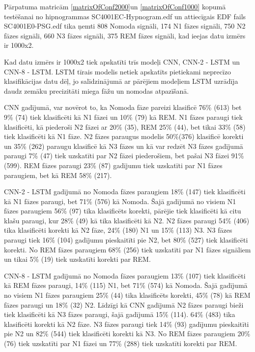 \documentclass[12pt,paper=A4]{report}
\begin{document}
Pārpatuma matricām \ref{matrixOfConf2000}un \ref{matrixOfConf1000} kopumā testēšanai no hipnogrammas SC4001EC-Hypnogram.edf un attiecīgais EDF fails SC4001E0-PSG.edf tika ņemti 808‬ Nomoda signāli, 174 N1 fāzes signāli, 750 N2 fāzes signāli, 660 N3 fāzes signāli, 375 REM fāzes signāli, kad ieejas datu izmērs ir 1000x2.

Kad datu izmērs ir 1000x2 tiek apskatīti trīs modeļi CNN, CNN-2 - LSTM un CNN-8 - LSTM. LSTM tīrais modelis netiek apskatīts pietiekami neprecīzo klasifikācijas datu dēļ, jo salīdzinājumā ar pārējiem modeļiem LSTM uzrādīja daudz zemāku precizitāti miega fāžu un nomodas atpazīšanā. 

CNN gadījumā, var novērot to, ka Nomoda fāze pareizi klasificē 76\% (613) bet 9\% (74) tiek klasificēti 
kā N1 fāzei un 10\% (79) kā REM.
N1 fāzes paraugi tiek klasificēti, kā piederoši N2 fāzei ar 20\% (35), REM 25\% (44), bet tikai 33\% (58) tiek klasificēti kā 
N1 fāze. 
N2 fāzes paraugus modelis 50\%(376) klasificē korekti un 35\% (262) paraugu klasificē kā N3 fāzes un kā var redzēt N3 fāzes
 gadījumā paraugi 7\% (47) tiek uzskatīti par N2 fāzei piederošiem, bet pašai N3 fāzei 91\% (599). 
 REM fāzes paraugi 23\% (87) gadījumu tiek uzskatīti par N1 fāzes paraugiem, bet kā REM 58\% (217). 

CNN-2 - LSTM gadījumā no Nomoda fāzes paraugiem 18\% (147) tiek klasificēti kā N1 fāzes paraugi, bet 71\% (576) kā Nomoda. 
Šajā gadījumā no visiem N1 fāzes paraugiem 56\% (97) tika klasificēts korekti, 
pārējie tiek klasificēti kā citu klašu paraugi, kur 28\% (49) kā tika klasificēti kā N2. 
N2 fāzes paraugi 54\% (406) tika klasificēti korekti kā N2 fāze, 24\% (180) N1 un 15\% (113) N3. 
N3 fāzes paraugi tiek 16\% (104) gadījumu pieskaitīti pie N2, bet 80\% (527) tiek klasificēti korekti.
No REM fāzes paraugiem 68\% (256) tiek uzskatīti par N1 fāzes signāliem un tikai 5\% (19) tiek uzskatīti korekti par REM.

CNN-8 - LSTM gadījumā no Nomoda fāzes paraugiem 13\% (107) tiek klasificēti kā REM fāzes paraugi, 14\% (115) N1, bet 71\% (574) kā Nomoda. 
Šajā gadījumā no visiem N1 fāzes paraugiem 25\% (44) tika klasificēts korekti, 45\% (78) kā REM fāzes paraugi un 18\% (32) N2. 
Līdzīgi kā CNN gadījumā N2 fāzes paraugi bieži tiek klasificēti kā N3 fāzes paraugi, šajā gadījumā 15\% (114). 64\% (483) tika klasificēti
korekti kā N2 fāze. 
N3 fāzes paraugi tiek 14\% (93) gadījumu pieskaitīti pie N2 un 82\% (544) tiek klasificēti korekti kā N3.
No REM fāzes paraugiem 20\% (76) tiek uzskatīti par N1 fāzei un 77\% (288) tiek uzskatīti korekti par REM. 
\end{document}
